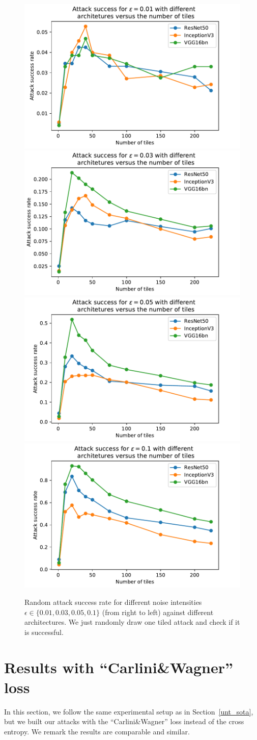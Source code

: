 \begin{figure}[htb]
\centering
\includegraphics[width=.23\textwidth]{sections/appendix/arxiv_dfo/images/rand_001.pdf}
\includegraphics[width=.23\textwidth]{sections/appendix/arxiv_dfo/images/rand_003.pdf}
\includegraphics[width=.23\textwidth]{sections/appendix/arxiv_dfo/images/rand_005.pdf}
\includegraphics[width=.23\textwidth]{sections/appendix/arxiv_dfo/images/rand_01.pdf}\\
\caption{\label{til2}Random attack success rate for different noise intensities $\epsilon\in\{0.01,0.03,0.05,0.1\}$ (from right to left) against different architectures. We just randomly draw one tiled attack and check if it is successful.}
\end{figure}

\section{Results with ``Carlini\&Wagner'' loss}
\label{cwsec}
In this section, we follow the same experimental setup as in Section~\ref{unt_sota}, but we built our attacks with the ``Carlini\&Wagner'' loss instead of the cross entropy. We remark the results are comparable and similar.

